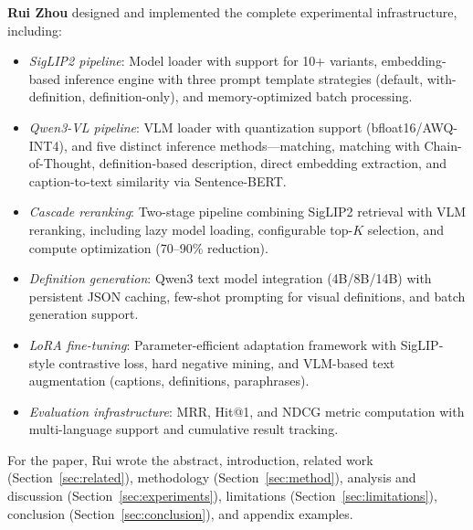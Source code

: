 \documentclass[11pt]{article}
\begin{document}
\textbf{Rui Zhou} designed and implemented the complete experimental infrastructure, including:
\begin{itemize}
    \item \textit{SigLIP2 pipeline}: Model loader with support for 10+ variants, embedding-based inference engine with three prompt template strategies (default, with-definition, definition-only), and memory-optimized batch processing.
    \item \textit{Qwen3-VL pipeline}: VLM loader with quantization support (bfloat16/AWQ-INT4), and five distinct inference methods---matching, matching with Chain-of-Thought, definition-based description, direct embedding extraction, and caption-to-text similarity via Sentence-BERT.
    \item \textit{Cascade reranking}: Two-stage pipeline combining SigLIP2 retrieval with VLM reranking, including lazy model loading, configurable top-$K$ selection, and compute optimization (70--90\% reduction).
    \item \textit{Definition generation}: Qwen3 text model integration (4B/8B/14B) with persistent JSON caching, few-shot prompting for visual definitions, and batch generation support.
    \item \textit{LoRA fine-tuning}: Parameter-efficient adaptation framework with SigLIP-style contrastive loss, hard negative mining, and VLM-based text augmentation (captions, definitions, paraphrases).
    \item \textit{Evaluation infrastructure}: MRR, Hit@1, and NDCG metric computation with multi-language support and cumulative result tracking.
\end{itemize}
For the paper, Rui wrote the abstract, introduction, related work (Section~\ref{sec:related}), methodology (Section~\ref{sec:method}), analysis and discussion (Section~\ref{sec:experiments}), limitations (Section~\ref{sec:limitations}), conclusion (Section~\ref{sec:conclusion}), and appendix examples.
\end{document}
